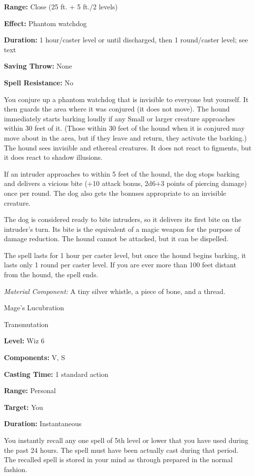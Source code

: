 \documentclass{article}
\begin{document}
\textbf{Range:} Close (25 ft. + 5 ft./2 levels)

\textbf{Effect:} Phantom watchdog

\textbf{Duration:} 1 hour/caster level or until discharged, then 1 round/caster 
level; see text

\textbf{Saving Throw:} None

\textbf{Spell Resistance:} No

You conjure up a phantom watchdog that is invisible to everyone but yourself. It 
then guards the area where it was conjured (it does not move). The hound immediately 
starts barking loudly if any Small or larger creature approaches within 30 feet 
of it. (Those within 30 feet of the hound when it is conjured may move about in 
the area, but if they leave and return, they activate the barking.) The hound sees 
invisible and ethereal creatures. It does not react to figments, but it does react 
to shadow illusions.

If an intruder approaches to within 5 feet of the hound, the dog stops barking 
and delivers a vicious bite (+10 attack bonus, 2d6+3 points of piercing damage) 
once per round. The dog also gets the bonuses appropriate to an invisible creature.

The dog is considered ready to bite intruders, so it delivers its first bite on 
the intruder's turn. Its bite is the equivalent of a magic weapon for the purpose 
of damage reduction. The hound cannot be attacked, but it can be dispelled.

The spell lasts for 1 hour per caster level, but once the hound begins barking, 
it lasts only 1 round per caster level. If you are ever more than 100 feet distant 
from the hound, the spell ends.

\textit{Material Component: }A tiny silver whistle, a piece of bone, and a thread.

\vspace{12pt}
Mage's Lucubration

Transmutation

\textbf{Level: }Wiz 6

\textbf{Components:} V, S

\textbf{Casting Time:} 1 standard action

\textbf{Range:} Personal

\textbf{Target:} You

\textbf{Duration:} Instantaneous

You instantly recall any one spell of 5th level or lower that you have used during 
the past 24 hours. The spell must have been actually cast during that period. The 
recalled spell is stored in your mind as through prepared in the normal fashion.
\end{document}
